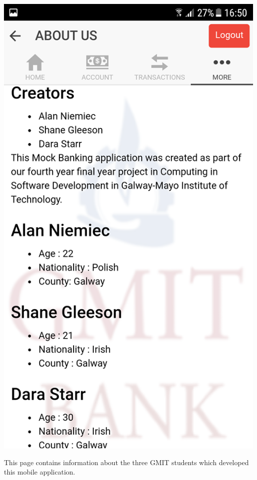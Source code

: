 \begin{center}
    \includegraphics[scale=0.5]{img/17moredetails.png}
\end{center}
This page contains information about the three GMIT students which developed this mobile application.\paragraph{}
